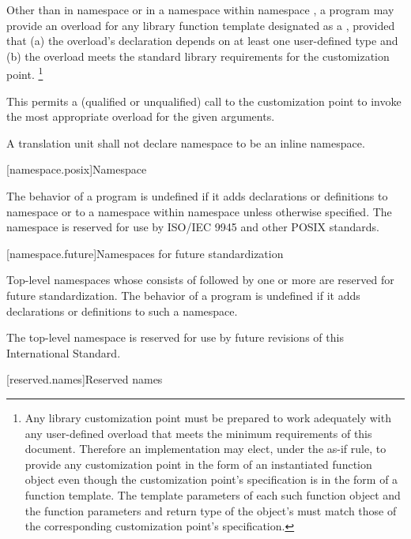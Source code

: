 \pnum
Other than in namespace 
or in a namespace
within namespace ,
a program may provide
an overload for any library function template
designated as a ,
provided that
(a)
the overload's declaration depends
on at least one user-defined type
and
(b)
the overload meets the standard library requirements
for the customization point.%
\footnote{
Any library customization point
must be prepared
to work adequately
with any user-defined overload
that meets the minimum requirements
of this document.
Therefore
an implementation may elect,
under the as-if rule,
to provide any customization point
in the form
of an instantiated function object
even though the customization point's specification
is in the form
of a function template.
The template parameters
of each such function object
and the function parameters
and return type
of the object's 
must match those
of the corresponding customization point's specification.}
\begin{note}
This permits
a (qualified or unqualified) call
to the customization point
to invoke the most appropriate overload
for the given arguments.
\end{note}

\pnum
A translation unit shall not declare namespace  to be an inline namespace.

[namespace.posix]{Namespace }

\pnum
The behavior of a \Cpp{} program is undefined if it adds declarations or definitions to namespace
or to a namespace within namespace
unless otherwise specified. The namespace  is reserved for use by
ISO/IEC 9945 and other POSIX standards.

[namespace.future]{Namespaces for future standardization}

\pnum
Top-level namespaces whose  consists of 
followed by one or more 
are reserved for future standardization.
The behavior of a \Cpp{} program is undefined if
it adds declarations or definitions to such a namespace.
\begin{example}
The top-level namespace  is reserved
for use by future revisions of this International Standard.
\end{example}

[reserved.names]{Reserved names}%

